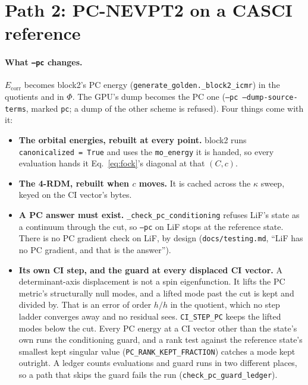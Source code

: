 \documentclass[11pt]{article}
\newcommand{\code}[1]{\texttt{#1}}
\newcommand{\Ecorr}{E_{\mathrm{corr}}}
\begin{document}
\section{Path 2: PC-NEVPT2 on a CASCI reference}
\label{sec:pc-casci}

\paragraph{What \code{--pc} changes.} $\Ecorr$ becomes block2's PC energy
(\code{generate\_golden.\_block2\_icmr}) in the quotients and in $\Phi$. The
GPU's dump becomes the PC one (\code{--pc --dump-source-terms}, marked
\code{pc}; a dump of the other scheme is refused). Four things come with it:
\begin{itemize}
\item \textbf{The orbital energies, rebuilt at every point.} block2 runs
  \code{canonicalized = True} and uses the \code{mo\_energy} it is handed, so
  every evaluation hands it Eq.~\eqref{eq:fock}'s diagonal at that $(C, c)$.
\item \textbf{The 4-RDM, rebuilt when $c$ moves.} It is cached across the
  $\kappa$ sweep, keyed on the CI vector's bytes.
\item \textbf{A PC answer must exist.} \code{\_check\_pc\_conditioning} refuses
  LiF's state as a continuum through the cut, so \code{--pc} on LiF stops at
  the reference state. There is no PC gradient check on LiF, by design
  (\code{docs/testing.md}, ``LiF has no PC gradient, and that is the answer'').
\item \textbf{Its own CI step, and the guard at every displaced CI vector.} A
  determinant-axis displacement is not a spin eigenfunction. It lifts the PC
  metric's structurally null modes, and a lifted mode past the cut is kept and
  divided by. That is an error of order $h/h$ in the quotient, which no step
  ladder converges away and no residual sees. \code{CI\_STEP\_PC} keeps the
  lifted modes below the cut. Every PC energy at a CI vector other than the
  state's own runs the conditioning guard, and a rank test against the
  reference state's smallest kept singular value
  (\code{PC\_RANK\_KEPT\_FRACTION}) catches a mode kept outright. A ledger
  counts evaluations and guard runs in two different places, so a path that
  skips the guard fails the run (\code{check\_pc\_guard\_ledger}).
\end{itemize}
\end{document}
